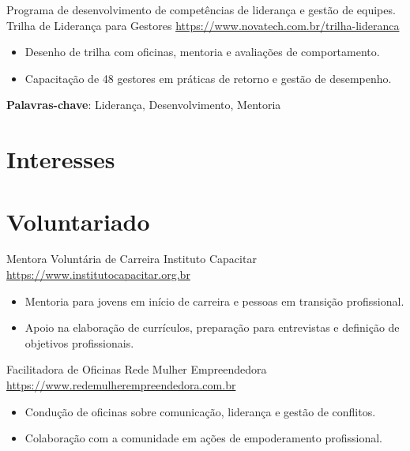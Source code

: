 \documentclass[a4paper, serif, 10pt]{moderncv}
\begin{document}
        {Programa de desenvolvimento de competências de liderança e gestão de equipes.}
        {Trilha de Liderança para Gestores}
        {\url{https://www.novatech.com.br/trilha-lideranca}}
        {}
        {\begin{itemize}
\item Desenho de trilha com oficinas, mentoria e avaliações de comportamento.
\item Capacitação de 48 gestores em práticas de retorno e gestão de desempenho.
\end{itemize}
\textbf{Palavras-chave}: Liderança, Desenvolvimento, Mentoria}
\section{Interesses}

\section{Voluntariado}

        {Mentora Voluntária de Carreira}
        {Instituto Capacitar}
        {\url{https://www.institutocapacitar.org.br}}
        {}
        {\begin{itemize}
\item Mentoria para jovens em início de carreira e pessoas em transição profissional.
\item Apoio na elaboração de currículos, preparação para entrevistas e definição de objetivos profissionais.
\end{itemize}}
    

        {Facilitadora de Oficinas}
        {Rede Mulher Empreendedora}
        {\url{https://www.redemulherempreendedora.com.br}}
        {}
        {\begin{itemize}
\item Condução de oficinas sobre comunicação, liderança e gestão de conflitos.
\item Colaboração com a comunidade em ações de empoderamento profissional.
\end{itemize}}
    
\end{document}
